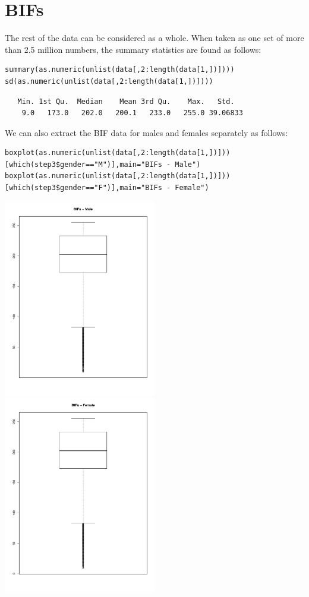 \documentclass{article}
\begin{document}
\section{BIFs}
The rest of the data can be considered as a whole. When taken as one set of more than 2.5 million numbers, the summary statistics are found as follows:\\
\begin{verbatim}
summary(as.numeric(unlist(data[,2:length(data[1,])])))
sd(as.numeric(unlist(data[,2:length(data[1,])])))
\end{verbatim}
\begin{verbatim}
   Min. 1st Qu.  Median    Mean 3rd Qu.    Max.   Std.
    9.0   173.0   202.0   200.1   233.0   255.0 39.06833
\end{verbatim}
We can also extract the BIF data for males and females separately as follows:\\
\begin{verbatim}
boxplot(as.numeric(unlist(data[,2:length(data[1,])]))[which(step3$gender=="M")],main="BIFs - Male")
boxplot(as.numeric(unlist(data[,2:length(data[1,])]))[which(step3$gender=="F")],main="BIFs - Female")
\end{verbatim}
\includegraphics[width=0.5\textwidth]{BIFMale.pdf}
\includegraphics[width=0.5\textwidth]{BIFFemale.pdf}\\
\end{document}
